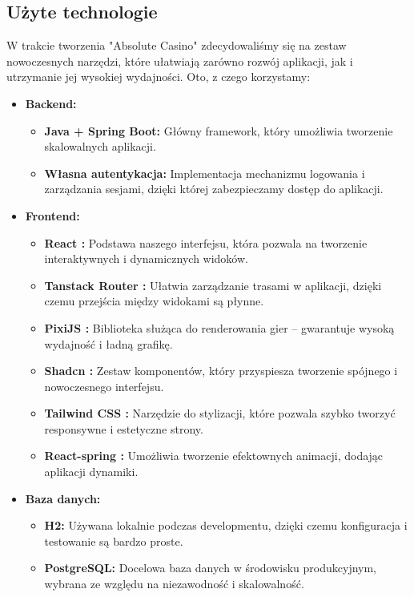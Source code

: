 \documentclass[a4paper,12pt]{article}
\begin{document}
\subsection{Użyte technologie}
W trakcie tworzenia "Absolute Casino" zdecydowaliśmy się na zestaw nowoczesnych narzędzi, które ułatwiają zarówno rozwój aplikacji, jak i utrzymanie jej wysokiej wydajności. Oto, z czego korzystamy:
\begin{itemize}[noitemsep]
    \item \textbf{Backend:}
    \begin{itemize}[noitemsep]
        \item \textbf{Java + Spring Boot:} Główny framework, który umożliwia tworzenie skalowalnych aplikacji.  
        \item \textbf{Własna autentykacja:} Implementacja mechanizmu logowania i zarządzania sesjami, dzięki której zabezpieczamy dostęp do aplikacji.
    \end{itemize}
    
    \item \textbf{Frontend:}
    \begin{itemize}[noitemsep]
        \item \textbf{React \cite{react}:} Podstawa naszego interfejsu, która pozwala na tworzenie interaktywnych i dynamicznych widoków.
        \item \textbf{Tanstack Router \cite{tanstack}:} Ułatwia zarządzanie trasami w aplikacji, dzięki czemu przejścia między widokami są płynne.
        \item \textbf{PixiJS \cite{pixi}:} Biblioteka służąca do renderowania gier – gwarantuje wysoką wydajność i ładną grafikę.
        \item \textbf{Shadcn \cite{shadcn}:} Zestaw komponentów, który przyspiesza tworzenie spójnego i nowoczesnego interfejsu.
        \item \textbf{Tailwind CSS \cite{tailwind}:} Narzędzie do stylizacji, które pozwala szybko tworzyć responsywne i estetyczne strony.
        \item \textbf{React-spring \cite{reactspring}:} Umożliwia tworzenie efektownych animacji, dodając aplikacji dynamiki.
    \end{itemize}
    
    \item \textbf{Baza danych:}
    \begin{itemize}[noitemsep]
        \item \textbf{H2:} Używana lokalnie podczas developmentu, dzięki czemu konfiguracja i testowanie są bardzo proste.
        \item \textbf{PostgreSQL:} Docelowa baza danych w środowisku produkcyjnym, wybrana ze względu na niezawodność i skalowalność.
    \end{itemize}
    

\end{itemize}
\end{document}
